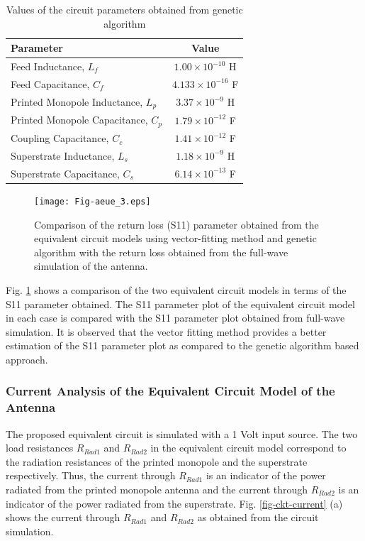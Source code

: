 \begin{table}
\centering
\caption{Values of the circuit parameters obtained from genetic algorithm}\label{table_eqckt}
\begin{tabular}{|l|c|}
\hline
Parameter & Value \\ \hline
Feed Inductance, $L_f$ & $1.00 \times 10^{-10}$ H \\ \hline
Feed Capacitance, $C_f$ & $4.133 \times 10^{-16}$ F \\ \hline
Printed Monopole Inductance, $L_p$ & $3.37 \times 10^{-9}$ H \\ \hline
Printed Monopole Capacitance, $C_p$ & $1.79 \times 10^{-12}$ F \\ \hline
Coupling Capacitance, $C_c$ & $1.41 \times 10^{-12}$ F \\ \hline
Superstrate Inductance, $L_s$ & $1.18 \times 10^{-9}$ H \\ \hline
Superstrate Capacitance, $C_s$ & $6.14 \times 10^{-13}$ F \\ \hline
\end{tabular}
\end{table}

\begin{figure}
\centering
\texttt{[image: Fig-aeue\_3.eps]}
\caption{Comparison of the return loss (S11) parameter obtained from the equivalent circuit models using vector-fitting method and genetic algorithm with the return loss obtained from the full-wave simulation of the antenna.}\label{fig_vc_ga}
\end{figure}

Fig. \ref{fig_vc_ga} shows a comparison of the two equivalent circuit models in terms of the S11 parameter obtained. The S11 parameter plot of the equivalent circuit model in each case is compared with the S11 parameter plot obtained from full-wave simulation. It is observed that the vector fitting method provides a better estimation of the S11 parameter plot as compared to the genetic algorithm based approach.

\subsubsection{Current Analysis of the Equivalent Circuit Model of the Antenna}
The proposed equivalent circuit is simulated with a 1 Volt input source. The two load resistances $R_{Rad1}$ and $R_{Rad2}$ in the equivalent circuit model correspond to the radiation resistances of the printed monopole and the superstrate respectively. Thus, the current through $R_{Rad1}$ is an indicator of the power radiated from the printed monopole antenna and the current through $R_{Rad2}$ is an indicator of the power radiated from the superstrate. Fig. \ref{fig-ckt-current} (a) shows the current through $R_{Rad1}$ and $R_{Rad2}$ as obtained from the circuit simulation.

